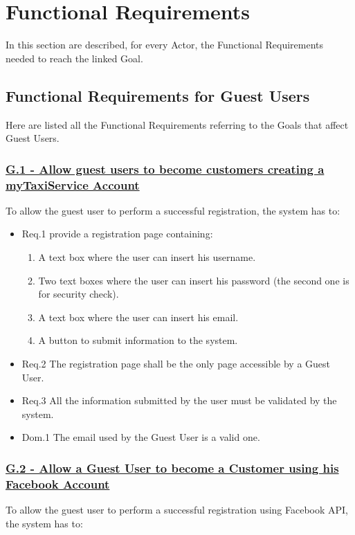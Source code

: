 \section{Functional Requirements}
	In this section are described, for every Actor, the Functional Requirements needed to reach the linked Goal.

		\subsection{Functional Requirements for Guest Users}
		Here are listed all the Functional Requirements referring to the Goals that affect Guest Users.

			\subsubsection{\lbrack \hyperref[sec:g1]{G.1 - Allow guest users to become customers creating a myTaxiService Account}\rbrack}\label{sec:frs1}
			To allow the guest user to perform a successful registration, the system has to:

				\begin{itemize}
					\item \lbrack Req.1\rbrack \label{sec:fr1_g1} provide a registration page containing:
						\begin{enumerate}
							\item A text box where the user can insert his username.
							\item Two text boxes where the user can insert his password (the second one is for security check).
							\item A text box where the user can insert his email. 
							\item A button to submit information to the system.
						\end{enumerate}
					\item \lbrack Req.2\rbrack \label{sec:fr2_g1} The registration page shall be the only page accessible by a Guest User.
					\item \lbrack Req.3\rbrack \label{sec:fr3_g1} All the information submitted by the user must be validated by the system.
					\item \lbrack Dom.1\rbrack \label{sec:da1_g1} The email used by the Guest User is a valid one.
				\end{itemize}

			\subsubsection{\lbrack \hyperref[sec:g2]{G.2 - Allow a Guest User to become a Customer using his Facebook Account}\rbrack}\label{sec:frs2}
			To allow the guest user to perform a successful registration using Facebook API, the system has to:

